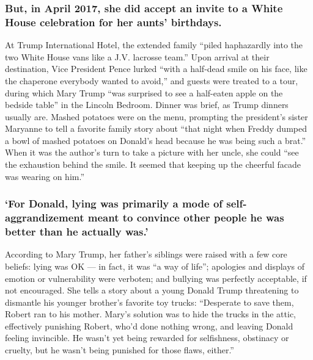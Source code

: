 \hypertarget{but-in-april-2017-she-did-accept-an-invite-to-a-white-house-celebration-for-her-aunts-birthdays}{%
\subsubsection{But, in April 2017, she did accept an invite to a White
House celebration for her aunts'
birthdays.}\label{but-in-april-2017-she-did-accept-an-invite-to-a-white-house-celebration-for-her-aunts-birthdays}}

At Trump International Hotel, the extended family ``piled haphazardly
into the two White House vans like a J.V. lacrosse team.'' Upon arrival
at their destination, Vice President Pence lurked ``with a half-dead
smile on his face, like the chaperone everybody wanted to avoid,'' and
guests were treated to a tour, during which Mary Trump ``was surprised
to see a half-eaten apple on the bedside table'' in the Lincoln Bedroom.
Dinner was brief, as Trump dinners usually are. Mashed potatoes were on
the menu, prompting the president's sister Maryanne to tell a favorite
family story about ``that night when Freddy dumped a bowl of mashed
potatoes on Donald's head because he was being such a brat.'' When it
was the author's turn to take a picture with her uncle, she could ``see
the exhaustion behind the smile. It seemed that keeping up the cheerful
facade was wearing on him.''

\hypertarget{for-donald-lying-was-primarily-a-mode-of-self-aggrandizement-meant-to-convince-other-people-he-was-better-than-he-actually-was}{%
\subsubsection{`For Donald, lying was primarily a mode of
self-aggrandizement meant to convince other people he was better than he
actually
was.'}\label{for-donald-lying-was-primarily-a-mode-of-self-aggrandizement-meant-to-convince-other-people-he-was-better-than-he-actually-was}}

According to Mary Trump, her father's siblings were raised with a few
core beliefs: lying was OK --- in fact, it was ``a way of life'';
apologies and displays of emotion or vulnerability were verboten; and
bullying was perfectly acceptable, if not encouraged. She tells a story
about a young Donald Trump threatening to dismantle his younger
brother's favorite toy trucks: ``Desperate to save them, Robert ran to
his mother. Mary's solution was to hide the trucks in the attic,
effectively punishing Robert, who'd done nothing wrong, and leaving
Donald feeling invincible. He wasn't yet being rewarded for selfishness,
obstinacy or cruelty, but he wasn't being punished for those flaws,
either.''

